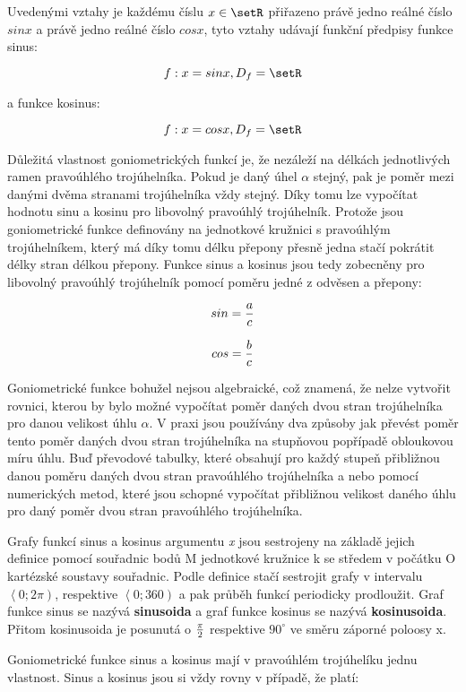 Uvedenými vztahy je každému číslu $x \in \setR$ přiřazeno právě jedno reálné číslo $sin x$ a právě jedno reálné číslo $cos x$, tyto vztahy udávají funkční předpisy funkce sinus:

$$ f :x = sin x, D_f = \setR $$

a funkce kosinus:

$$ f :x = cos x, D_f = \setR $$

Důležitá vlastnost goniometrických funkcí je, že nezáleží na délkách jednotlivých ramen pravoúhlého trojúhelníka. Pokud je daný úhel $\alpha$ stejný, pak je poměr mezi danými dvěma stranami trojúhelníka vždy stejný. Díky tomu lze vypočítat hodnotu sinu a kosinu pro libovolný pravoúhlý trojúhelník. Protože jsou goniometrické funkce definovány na jednotkové kružnici s pravoúhlým trojúhelníkem, který má díky tomu délku přepony přesně jedna stačí pokrátit délky stran délkou přepony. Funkce sinus a kosinus jsou tedy zobecněny pro libovolný pravoúhlý trojúhelník pomocí poměru jedné z odvěsen a přepony: 

$$ sin = {a \over c }$$

$$ cos = {b \over c }$$

Goniometrické funkce bohužel nejsou algebraické, což znamená, že nelze vytvořit rovnici, kterou by bylo možné vypočítat poměr daných dvou stran trojúhelníka pro danou velikost úhlu $\alpha$. V praxi jsou používány dva způsoby jak převést poměr tento poměr daných dvou stran trojúhelníka na stupňovou popřípadě obloukovou míru úhlu. Buď převodové tabulky, které obsahují pro každý stupeň přibližnou danou poměru daných dvou stran pravoúhlého trojúhelníka a nebo pomocí numerických metod, které jsou schopné vypočítat přibližnou velikost daného úhlu pro daný poměr dvou stran pravoúhlého trojúhelníka.

Grafy funkcí sinus a kosinus argumentu {\it x} jsou sestrojeny na základě jejich definice pomocí souřadnic bodů M jednotkové kružnice k se středem v počátku O kartézské soustavy souřadnic. Podle definice stačí sestrojit grafy v intervalu $\left< 0;2\pi \right)$, respektive $\left< 0;360 \right)$ a pak průběh funkcí periodicky prodloužit. Graf funkce sinus se nazývá {\bf sinusoida} a graf funkce kosinus se nazývá {\bf kosinusoida}. Přitom kosinusoida je posunutá o $\pi \over 2$ respektive $90^\circ$ ve směru záporné poloosy x.


Goniometrické funkce sinus a kosinus mají v pravoúhlém trojúhelíku jednu vlastnost. Sinus a kosinus jsou si vždy rovny v případě, že platí:

